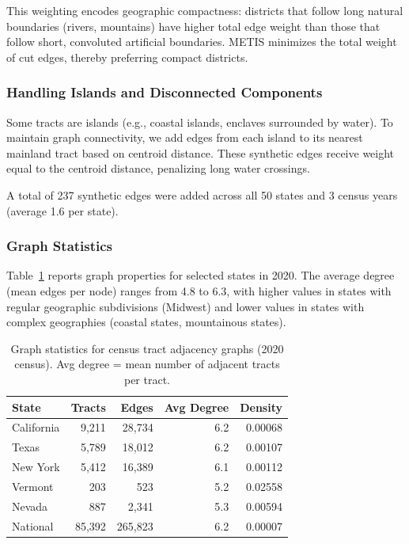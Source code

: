 This weighting encodes geographic compactness: districts that follow long natural boundaries (rivers, mountains) have higher total edge weight than those that follow short, convoluted artificial boundaries. METIS minimizes the total weight of cut edges, thereby preferring compact districts.

\subsubsection{Handling Islands and Disconnected Components}

Some tracts are islands (e.g., coastal islands, enclaves surrounded by water). To maintain graph connectivity, we add edges from each island to its nearest mainland tract based on centroid distance. These synthetic edges receive weight equal to the centroid distance, penalizing long water crossings.

A total of 237 synthetic edges were added across all 50 states and 3 census years (average 1.6 per state).

\subsubsection{Graph Statistics}

Table~\ref{tab:graph-stats} reports graph properties for selected states in 2020. The average degree (mean edges per node) ranges from 4.8 to 6.3, with higher values in states with regular geographic subdivisions (Midwest) and lower values in states with complex geographies (coastal states, mountainous states).

\begin{table}[t]
\centering
\caption{Graph statistics for census tract adjacency graphs (2020 census). Avg degree = mean number of adjacent tracts per tract.}
\label{tab:graph-stats}
\begin{tabular}{lrrrr}
\toprule
State & Tracts & Edges & Avg Degree & Density \\
\midrule
California & 9,211 & 28,734 & 6.2 & 0.00068 \\
Texas & 5,789 & 18,012 & 6.2 & 0.00107 \\
New York & 5,412 & 16,389 & 6.1 & 0.00112 \\
Vermont & 203 & 523 & 5.2 & 0.02558 \\
Nevada & 887 & 2,341 & 5.3 & 0.00594 \\
National & 85,392 & 265,823 & 6.2 & 0.00007 \\
\bottomrule
\end{tabular}
\end{table}

